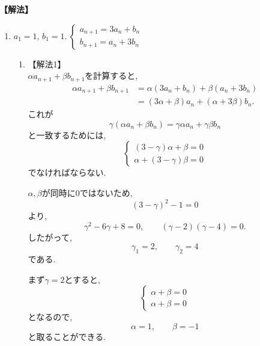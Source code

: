 \documentclass[dvipdfmx,a4paper,11pt,fleqn,openany]{jsbook}
\begin{document}
      \noindent\textbf{【解法】}
      \begin{enumerate}[label=(\arabic*),parsep=3pt]
      \item $\displaystyle a_1=1,\,b_1=1.\ \begin{cases}a_{n+1}=3a_n+b_n\\ b_{n+1}=a_n+3b_n\end{cases}$\\
            \begin{enumerate}
              \item 【解法1】\\
                    $\alpha a_{n+1}+\beta b_{n+1}$を計算すると,
                    \begin{align*}
                      \alpha a_{n+1}+\beta b_{n+1}
                        &=\alpha(3a_n+b_n)+\beta(a_n+3b_n)\\
                        &=(3\alpha+\beta)a_n+(\alpha+3\beta)b_n.
                    \end{align*}
                    これが
                    \[
                      \gamma(\alpha a_n+\beta b_n)
                      =\gamma\alpha a_n+\gamma\beta b_n
                    \]
                    と一致するためには,
                    \[
                    \begin{cases}
                      (3-\gamma)\alpha+\beta=0\\
                      \alpha+(3-\gamma)\beta=0
                    \end{cases}
                    \]
                    でなければならない.

                    $\alpha,\beta$が同時に$0$ではないため,
                    \[
                      (3-\gamma)^2-1=0
                    \]
                    より,
                    \[
                      \gamma^2-6\gamma+8=0,
                      \qquad
                      (\gamma-2)(\gamma-4)=0.
                    \]
                    したがって,
                    \[
                      \gamma_1=2,\qquad\gamma_2=4
                    \]
                    である.

                    まず$\gamma=2$とすると,
                    \[
                    \begin{cases}
                      \alpha+\beta=0\\
                      \alpha+\beta=0
                    \end{cases}
                    \]
                    となるので,
                    \[
                      \alpha=1,\qquad\beta=-1
                    \]
                    と取ることができる.


\end{enumerate}
\end{enumerate}
\end{document}
